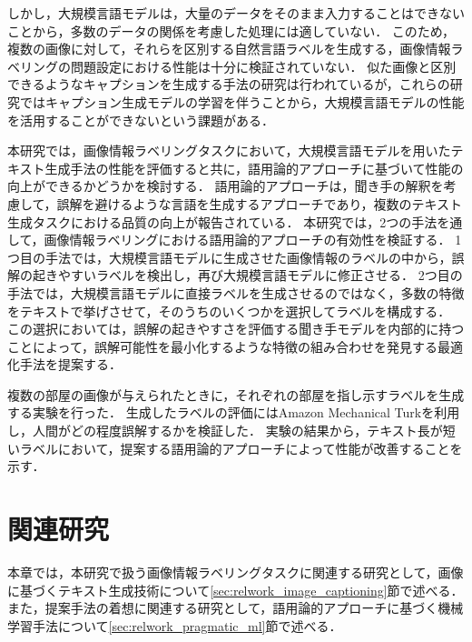 \documentclass[a4paper,11pt]{jreport}
\begin{document}
しかし，大規模言語モデルは，大量のデータをそのまま入力することはできないことから，多数のデータの関係を考慮した処理には適していない．
このため，複数の画像に対して，それらを区別する自然言語ラベルを生成する，画像情報ラベリングの問題設定における性能は十分に検証されていない．
似た画像と区別できるようなキャプションを生成する手法の研究は行われている\cite{Vedantam2017,Cohn-Gordon2018,Nie2020,Andreas2016}が，これらの研究ではキャプション生成モデルの学習を伴うことから，大規模言語モデルの性能を活用することができないという課題がある．

本研究では，画像情報ラベリングタスクにおいて，大規模言語モデルを用いたテキスト生成手法の性能を評価すると共に，語用論的アプローチに基づいて性能の向上ができるかどうかを検討する．
語用論的アプローチは，聞き手の解釈を考慮して，誤解を避けるような言語を生成するアプローチであり，複数のテキスト生成タスクにおける品質の向上が報告されている．
本研究では，2つの手法を通して，画像情報ラベリングにおける語用論的アプローチの有効性を検証する．
1つ目の手法では，大規模言語モデルに生成させた画像情報のラベルの中から，誤解の起きやすいラベルを検出し，再び大規模言語モデルに修正させる．
2つ目の手法では，大規模言語モデルに直接ラベルを生成させるのではなく，多数の特徴をテキストで挙げさせて，そのうちのいくつかを選択してラベルを構成する．
この選択においては，誤解の起きやすさを評価する聞き手モデルを内部的に持つことによって，誤解可能性を最小化するような特徴の組み合わせを発見する最適化手法を提案する．

複数の部屋の画像が与えられたときに，それぞれの部屋を指し示すラベルを生成する実験を行った．
生成したラベルの評価にはAmazon Mechanical Turkを利用し，人間がどの程度誤解するかを検証した．
実験の結果から，テキスト長が短いラベルにおいて，提案する語用論的アプローチによって性能が改善することを示す．


\chapter{関連研究}

本章では，本研究で扱う画像情報ラベリングタスクに関連する研究として，画像に基づくテキスト生成技術について\ref{sec:relwork_image_captioning}節で述べる．
また，提案手法の着想に関連する研究として，語用論的アプローチに基づく機械学習手法について\ref{sec:relwork_pragmatic_ml}節で述べる．
\end{document}
